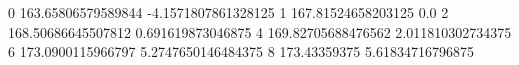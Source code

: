 0 163.65806579589844 -4.1571807861328125
1 167.81524658203125 0.0
2 168.50686645507812 0.691619873046875
4 169.82705688476562 2.011810302734375
6 173.0900115966797 5.2747650146484375
8 173.43359375 5.61834716796875

